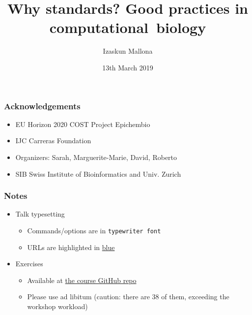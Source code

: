 \documentclass{beamer}
\title{Why standards? Good practices in computational~biology}
\institute{COST Project Epichembio - Introduction to NGS data analysis}
\author[izaskun.mallona@sib.swiss]{Izaskun Mallona}
\date{13th March 2019}
\begin{document}
\begin{frame}
  \titlepage
\end{frame}


\begin{frame}
  \frametitle{Acknowledgements}
  \begin{itemize}
  \item EU Horizon 2020 COST Project Epichembio 
  \item IJC Carreras Foundation
  \item Organizers: Sarah, Marguerite-Marie, David, Roberto
  \item SIB Swiss Institute of Bioinformatics and Univ. Zurich
  \end{itemize}
\end{frame}





\begin{frame}
  \frametitle{Notes}
  \begin{itemize}
  \item Talk typesetting
    \begin{itemize}
    \item Commands/options are in \texttt{typewriter font}
    \item URLs are highlighted in \href{https://genome-euro.ucsc.edu/cgi-bin/hgGateway}{blue}
    \end{itemize}
  \item Exercises
    \begin{itemize}
    \item Available at \href{https://github.com/imallona/compbio_data_formats}{the course GitHub repo}
    \item Please use ad libitum (caution: there are 38 of them, exceeding the workshop workload)
    \end{itemize}
  \end{itemize}

\end{frame}
\end{document}
